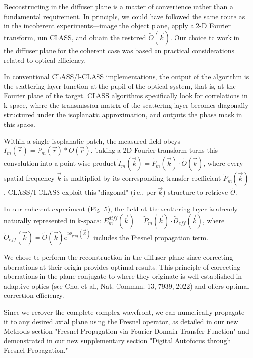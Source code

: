 \documentclass[12pt]{article}
\newenvironment{ourresponse}
    {\begin{tcolorbox}[width=\linewidth,breakable,enhanced,colback=gray!5,colframe=responsecolor!50,title=Response,left=5pt,right=5pt]}
    {\end{tcolorbox}}
\begin{document}
\begin{enumerate}[label=\arabic*.]
\begin{ourresponse}
        Reconstructing in the diffuser plane is a matter of convenience rather than a fundamental requirement. In principle, we could have followed the same route as in the incoherent experiments—image the object plane, apply a 2-D Fourier transform, run CLASS, and obtain the restored $\tilde{O}(\vec{k})$. Our choice to work in the diffuser plane for the coherent case was based on practical considerations related to optical efficiency.
        
        In conventional CLASS/I-CLASS implementations, the output of the algorithm is the scattering layer function at the pupil of the optical system, that is, at the Fourier plane of the target. CLASS algorithms specifically look for correlations in k-space, where the transmission matrix of the scattering layer becomes diagonally structured under the isoplanatic approximation, and outputs the phase mask in this space.
        
        Within a single isoplanatic patch, the measured field obeys $I_m(\vec{r})=P_m(\vec{r})*O(\vec{r})$. Taking a 2D Fourier transform turns this convolution into a point-wise product $\tilde{I}_m(\vec{k})=\tilde{P}_m(\vec{k})\cdot\tilde{O}(\vec{k})$, where every spatial frequency $\vec{k}$ is multiplied by its corresponding transfer coefficient $\tilde{P}_m(\vec{k})$. CLASS/I-CLASS exploit this "diagonal" (i.e., per-$\vec{k}$) structure to retrieve $\tilde{O}$.
        
        In our coherent experiment (Fig. 5), the field at the scattering layer is already naturally represented in k-space:
        $E^{diff}_m(\vec{k})=\tilde{P}_m(\vec{k})\cdot\tilde{O}_{eff}(\vec{k})$,
        where $\tilde{O}_{eff}(\vec{k}) = \tilde{O}(\vec{k})e^{i\phi_{prop}(\vec{k})}$ includes the Fresnel propagation term.
        
        We chose to perform the reconstruction in the diffuser plane since correcting aberrations at their origin provides optimal results. This principle of correcting aberrations in the plane conjugate to where they originate is well-established in adaptive optics (see Choi et al., Nat. Commun. 13, 7939, 2022) and offers optimal correction efficiency.
        
        Since we recover the complete complex wavefront, we can numerically propagate it to any desired axial plane using the Fresnel operator, as detailed in our new Methods section "Fresnel Propagation via Fourier-Domain Transfer Function" and demonstrated in our new supplementary section "Digital Autofocus through Fresnel Propagation."
    \end{ourresponse}



\end{enumerate}
\end{document}
